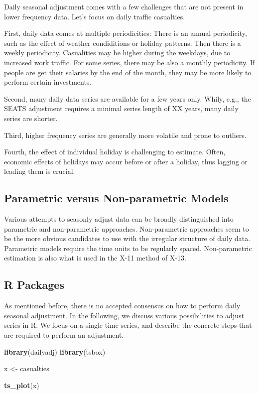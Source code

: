 \documentclass[
]{article}
\newenvironment{Shaded}{\begin{snugshade}}{\end{snugshade}}
\newcommand{\KeywordTok}[1]{\textcolor[rgb]{0.13,0.29,0.53}{\textbf{#1}}}
\newcommand{\NormalTok}[1]{#1}
\newcommand{\StringTok}[1]{\textcolor[rgb]{0.31,0.60,0.02}{#1}}
\begin{document}
Daily seasonal adjustment comes with a few challenges that are not
present in lower frequency data. Let's focus on daily traffic
casualties.

First, daily data comes at multiple periodicities: There is an annual
periodicity, such as the effect of weather condiditions or holiday
patterns. Then there is a weekly periodicity. Casualities may be higher
during the weekdays, due to increased work traffic. For some series,
there may be also a monthly periodicity. If people are get their
salaries by the end of the month, they may be more likely to perform
certain investments.

Second, many daily data series are available for a few years only.
Whily, e.g., the SEATS adjustment requires a minimal series length of XX
years, many daily series are shorter.

Third, higher frequency series are generally more volatile and prone to
outliers.

Fourth, the effect of individual holiday is challenging to estimate.
Often, economic effects of holidays may occur before or after a holiday,
thus lagging or leading them is crucial.

\hypertarget{parametric-versus-non-parametric-models}{%
\subsection{Parametric versus Non-parametric
Models}\label{parametric-versus-non-parametric-models}}

Various attempts to seasonly adjust data can be broadly distinguished
into parametric and non-parametric approaches. Non-parametric approaches
seem to be the more obvious candidates to use with the irregular
structure of daily data. Parametric models require the time units to be
regularly spaced. Non-parametric estimation is also what is used in the
X-11 method of X-13.

\hypertarget{r-packages}{%
\subsection{R Packages}\label{r-packages}}

As mentioned before, there is no accepted consensus on how to perform
daily seasonal adjustment. In the following, we discuss various
possibilities to adjust series in R. We focus on a single time series,
and describe the concrete steps that are required to perform an
adjustment.

\begin{Shaded}
\begin{Highlighting}[]
\KeywordTok{library}\NormalTok{(dailyadj)}
\KeywordTok{library}\NormalTok{(tsbox)}

\NormalTok{x <-}\StringTok{ }\NormalTok{casualties}

\KeywordTok{ts_plot}\NormalTok{(x)}
\end{Highlighting}
\end{Shaded}
\end{document}
